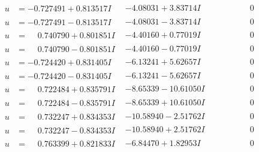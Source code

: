 \documentclass[1p]{elsarticle_modified}
\theoremstyle{definition}
\begin{document}
$$\begin{array}{c|c|c}
\begin{aligned}
u &= -0.727491 + 0.813517 I\end{aligned}
 & -4.08031 + 3.83714 I & \phantom{-0.000000 } 0 \\ \hline\begin{aligned}
u &= -0.727491 - 0.813517 I\end{aligned}
 & -4.08031 - 3.83714 I & \phantom{-0.000000 } 0 \\ \hline\begin{aligned}
u &= \phantom{-}0.740790 + 0.801851 I\end{aligned}
 & -4.40160 + 0.77019 I & \phantom{-0.000000 } 0 \\ \hline\begin{aligned}
u &= \phantom{-}0.740790 - 0.801851 I\end{aligned}
 & -4.40160 - 0.77019 I & \phantom{-0.000000 } 0 \\ \hline\begin{aligned}
u &= -0.724420 + 0.831405 I\end{aligned}
 & -6.13241 + 5.62657 I & \phantom{-0.000000 } 0 \\ \hline\begin{aligned}
u &= -0.724420 - 0.831405 I\end{aligned}
 & -6.13241 - 5.62657 I & \phantom{-0.000000 } 0 \\ \hline\begin{aligned}
u &= \phantom{-}0.722484 + 0.835791 I\end{aligned}
 & -8.65339 - 10.61050 I & \phantom{-0.000000 } 0 \\ \hline\begin{aligned}
u &= \phantom{-}0.722484 - 0.835791 I\end{aligned}
 & -8.65339 + 10.61050 I & \phantom{-0.000000 } 0 \\ \hline\begin{aligned}
u &= \phantom{-}0.732247 + 0.834353 I\end{aligned}
 & -10.58940 - 2.51762 I & \phantom{-0.000000 } 0 \\ \hline\begin{aligned}
u &= \phantom{-}0.732247 - 0.834353 I\end{aligned}
 & -10.58940 + 2.51762 I & \phantom{-0.000000 } 0 \\ \hline\begin{aligned}
u &= \phantom{-}0.763399 + 0.821833 I\end{aligned}
 & -6.84470 + 1.82953 I & \phantom{-0.000000 } 0 \\ \hline\begin{aligned}

\end{aligned}
\end{array}$$
\end{document}
